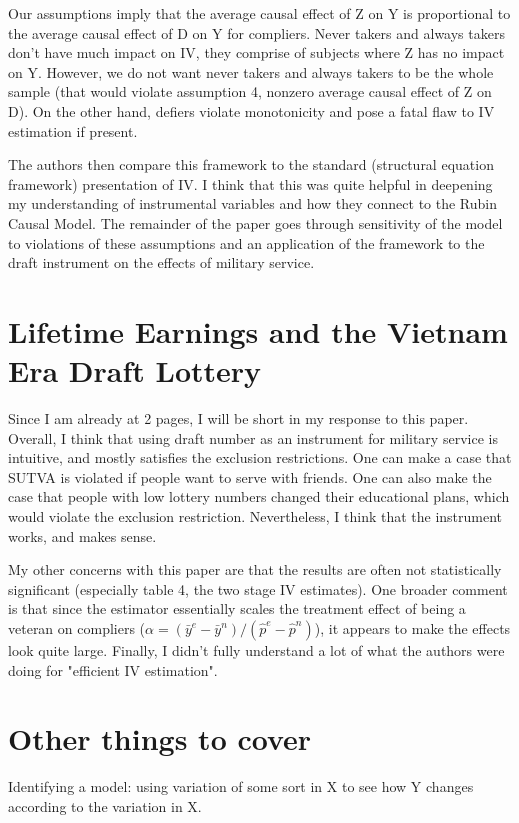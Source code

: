 \documentclass[12 pt, leqno]{article}
\begin{document}
Our assumptions imply that the average causal effect of Z on Y is proportional to the average causal effect of D on Y for compliers. Never takers and always takers don't have much impact on IV, they comprise of subjects where Z has no impact on Y. However, we do not want never takers and always takers to be the whole sample (that would violate assumption 4, nonzero average causal effect of Z on D). On the other hand, defiers violate monotonicity and pose a fatal flaw to IV estimation if present. 

The authors then compare this framework to the standard (structural equation framework) presentation of IV. I think that this was quite helpful in deepening my understanding of instrumental variables and how they connect to the Rubin Causal Model. The remainder of the paper goes through sensitivity of the model to violations of these assumptions and an application of the framework to the draft instrument on the effects of military service.

\section{Lifetime Earnings and the Vietnam Era Draft Lottery}

Since I am already at 2 pages, I will be short in my response to this paper. Overall, I think that using draft number as an instrument for military service is intuitive, and mostly satisfies the exclusion restrictions. One can make a case that SUTVA is violated if people want to serve with friends. One can also make the case that people with low lottery numbers changed their educational plans, which would violate the exclusion restriction. Nevertheless, I think that the instrument works, and makes sense. 

My other concerns with this paper are that the results are often not statistically significant (especially table 4, the two stage IV estimates). One broader comment is that since the estimator essentially scales the treatment effect of being a veteran on compliers ($\alpha = (\bar{y}^e - \bar{y}^n)/(\hat{p}^e -\hat{p}^n)$), it appears to make the effects look quite large. Finally, I didn't fully understand a lot of what the authors were doing for "efficient IV estimation". 

\section{Other things to cover}
Identifying a model: using variation of some sort in X to see how Y changes according to the variation in X. 
\end{document}
